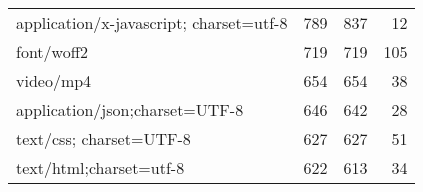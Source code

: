 \begin{tabular}{lrrr}
application/x-javascript; charset=utf-8 &      789 &         837 &     12 \\
                             font/woff2 &      719 &         719 &    105 \\
                              video/mp4 &      654 &         654 &     38 \\
         application/json;charset=UTF-8 &      646 &         642 &     28 \\
                text/css; charset=UTF-8 &      627 &         627 &     51 \\
                text/html;charset=utf-8 &      622 &         613 &     34 \\
\bottomrule
\end{tabular}
